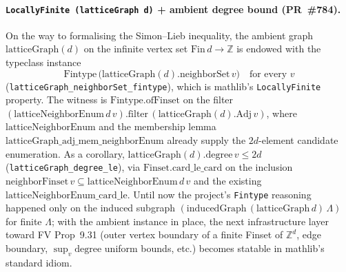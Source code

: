 \documentclass[a4paper,11pt]{article}
\begin{document}
\paragraph{\texttt{LocallyFinite (latticeGraph d)} + ambient
degree bound (PR~\#784).}
On the way to formalising the Simon--Lieb inequality, the ambient
graph $\mathrm{latticeGraph}(d)$ on the infinite vertex set
$\mathrm{Fin}\,d \to \mathbb Z$ is endowed with the typeclass
instance
\[
  \mathrm{Fintype}\,\bigl(\mathrm{latticeGraph}(d).\mathrm{neighborSet}\,v\bigr)
  \quad \text{for every } v
\]
(\texttt{latticeGraph\_neighborSet\_fintype}), which is mathlib's
\texttt{LocallyFinite} property. The witness is
$\mathrm{Fintype.ofFinset}$ on the filter
$(\mathrm{latticeNeighborEnum}\,d\,v).\mathrm{filter}\,
(\mathrm{latticeGraph}(d).\mathrm{Adj}\,v)$, where
$\mathrm{latticeNeighborEnum}$ and the membership lemma
$\mathrm{latticeGraph\_adj\_mem\_neighborEnum}$ already supply the
$2d$-element candidate enumeration. As a corollary,
$\mathrm{latticeGraph}(d).\mathrm{degree}\,v \le 2d$
(\texttt{latticeGraph\_degree\_le}), via
$\mathrm{Finset.card\_le\_card}$ on the inclusion
$\mathrm{neighborFinset}\,v \subseteq \mathrm{latticeNeighborEnum}\,d\,v$
and the existing $\mathrm{latticeNeighborEnum\_card\_le}$. Until
now the project's \texttt{Fintype} reasoning happened only on the
induced subgraph $(\mathrm{inducedGraph}\,(\mathrm{latticeGraph}\,d)\,\Lambda)$
for finite $\Lambda$; with the ambient instance in place, the
next infrastructure layer toward FV Prop~9.31 (outer vertex
boundary of a finite Finset of $\mathbb Z^d$, edge boundary,
$\sup_v \mathrm{degree}$ uniform bounds, etc.) becomes statable
in mathlib's standard idiom.
\end{document}
